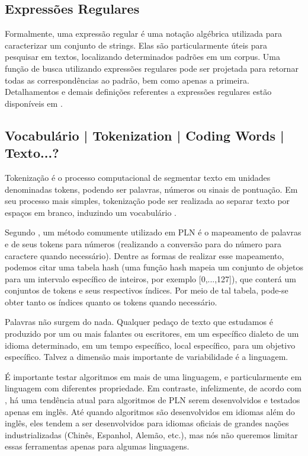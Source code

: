 \documentclass{automatextcc}
\begin{document}
\subsection{Expressões Regulares}
Formalmente, uma expressão regular é uma notação algébrica utilizada para caracterizar um conjunto de strings. Elas são particularmente úteis para pesquisar em textos, localizando determinados padrões em um corpus. Uma função de busca utilizando expressões regulares pode ser projetada para retornar todas as correspondências ao padrão, bem como apenas a primeira. Detalhamentos e demais definições referentes a expressões regulares estão disponíveis em \citet{jurafsky2021}.


\subsection{Vocabulário | Tokenization | Coding Words | Texto...?}
Tokenização é o processo computacional de segmentar texto em unidades denominadas tokens, podendo ser palavras, números ou sinais de pontuação. Em seu processo mais simples, tokenização pode ser realizada ao separar texto por espaços em branco, induzindo um vocabulário \citep{kamath2019, jurafsky2021}.

Segundo \citet{manning1999}, um método comumente utilizado em PLN é o mapeamento de palavras e de seus tokens para números (realizando a conversão para do número para caractere quando necessário). Dentre as formas de realizar esse mapeamento, podemos citar uma tabela hash (uma função hash mapeia um conjunto de objetos para um intervalo específico de inteiros, por exemplo [0,...,127]), que conterá um conjuntos de tokens e seus respectivos índices. Por meio de tal tabela, pode-se obter tanto os índices quanto os tokens quando necessário.

Palavras não surgem do nada. Qualquer pedaço de texto que estudamos é produzido por um ou mais falantes ou escritores, em um específico dialeto de um idioma determinado, em um tempo específico, local específico, para um objetivo específico. Talvez a dimensão mais importante de variabilidade é a linguagem.

É importante testar algoritmos em mais de uma linguagem, e particularmente em linguagem com diferentes propriedade. Em contraste, infelizmente, de acordo com \citet{bender2019}, há uma tendência atual para algoritmos de PLN serem desenvolvidos e testados apenas em inglês. Até quando algoritmos são desenvolvidos em idiomas além do inglês, eles tendem a ser desenvolvidos para idiomas oficiais de grandes nações industrializadas (Chinês, Espanhol, Alemão, etc.), mas nós não queremos limitar essas ferramentas apenas para algumas linguagens.
\end{document}

